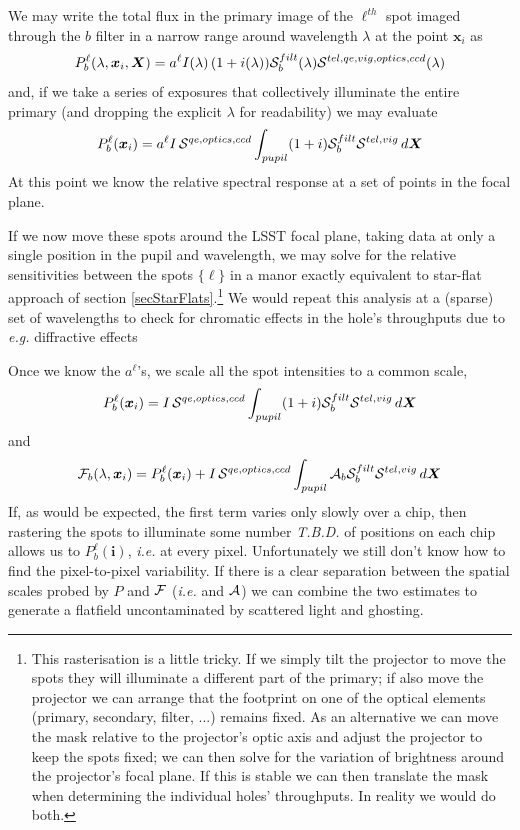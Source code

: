 \documentclass[12pt]{article}
\newcommand{\eg}{\textit{e.g.}\xspace}
\newcommand{\ie}{\textit{i.e.}\xspace}
\newcommand{\ib}{{\boldsymbol i}}
\newcommand{\Xb}{{\boldsymbol X}}
\newcommand{\xb}{{\boldsymbol x}}
\newcommand{\Flat}{{\cal F}}
\newcommand{\additive}{{\cal A}}
\newcommand{\qe}{{\cal S}}
\newcommand{\TBD}{\textit{T.B.D.}\xspace}
\begin{document}
We may write the total flux in the primary image of the $\ell^{th}$ spot imaged through the $b$ filter in a narrow
range around wavelength $\lambda$ at the point $\xb_i$ as
$$
P_b^\ell(\lambda, \xb_i, \Xb) = a^\ell I(\lambda)\, (1 + i(\lambda)) \qe_b^{filt}(\lambda)
 \qe^{tel, qe, vig, optics, ccd}(\lambda)
$$
and, if we take a series of exposures that collectively illuminate the entire primary (and dropping
the explicit $\lambda$ for readability) we may evaluate
$$
P_b^\ell(\xb_i) = a^\ell I\, \qe^{qe, optics, ccd}
                   \int_{pupil} (1 + i) \qe_b^{filt} \qe^{tel, vig}\,d\Xb
$$
At this point we know the relative spectral response at a set of points in the focal plane.                   

If we now move these spots around the LSST focal plane, taking data at only a single position in the pupil and
wavelength, we may solve for the relative sensitivities between the spots $\{\ell\}$ in a manor exactly
equivalent to star-flat approach of section \ref{secStarFlats}.\footnote{ This rasterisation is a little tricky.  If
  we simply tilt the projector to move the spots they will illuminate a different part of the primary; if also
  move the projector we can arrange that the footprint on one of the optical elements (primary, secondary,
  filter, ...) remains fixed.  As an alternative we can move the mask relative to the projector's optic axis
  and adjust the projector to keep the spots fixed; we can then solve for the variation of brightness around
  the projector's focal plane.  If this is stable we can then translate the mask when determining the
  individual holes' throughputs.  In reality we would do both.  }
We would repeat this analysis at a (sparse) set of wavelengths to check for chromatic effects in the hole's
throughputs due to \eg diffractive effects

Once we know the $a^\ell$'s, we scale all the spot intensities to a common scale,
$$
P_b^\ell(\xb_i) = I\, \qe^{qe, optics, ccd} \int_{pupil} (1 + i) \qe_b^{filt} \qe^{tel, vig}\,d\Xb
$$
and
$$
\Flat_b(\lambda, \xb_i) = P_b^\ell(\xb_i) + I\, \qe^{qe, optics, ccd}
                              \int_{pupil} \additive_b \qe_b^{filt} \qe^{tel, vig}\, d\Xb
$$
If, as would be expected, the first term varies only slowly over a chip, then rastering the spots to
illuminate some number \TBD of positions on each chip allows us to $P_b^\ell(\ib)$, \ie at every pixel.
Unfortunately we still don't know how to find the pixel-to-pixel variability.  If there is a clear
separation between the spatial scales probed by $P$ and $\Flat$ (\ie and $\additive$) we can combine
the two estimates to generate a flatfield uncontaminated by scattered light and ghosting.
\end{document}
